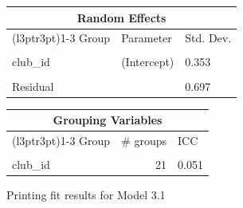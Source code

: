 \documentclass[
  12pt]{article}
\begin{document}
\begin{table}[!h]
\begin{tabular}{lll}
\toprule
\multicolumn{3}{c}{Random Effects} \\
\cmidrule(l{3pt}r{3pt}){1-3}
Group & Parameter & Std. Dev.\\
\midrule
\cellcolor{gray!10}{player\_id} & \cellcolor{gray!10}{(Intercept)} & \cellcolor{gray!10}{1.351}\\
club\_id & (Intercept) & 0.353\\
\cellcolor{gray!10}{club\_id} & \cellcolor{gray!10}{season\_year\_c} & \cellcolor{gray!10}{0.039}\\
Residual &  & 0.697\\
\bottomrule
\end{tabular}
\end{table} \begin{table}[!h]
\centering
\begin{tabular}{lrl}
\toprule
\multicolumn{3}{c}{Grouping Variables} \\
\cmidrule(l{3pt}r{3pt}){1-3}
Group & \# groups & ICC\\
\midrule
\cellcolor{gray!10}{player\_id} & \cellcolor{gray!10}{2159} & \cellcolor{gray!10}{0.749}\\
club\_id & 21 & 0.051\\
\bottomrule
\end{tabular}
\end{table}

\newpage

Printing fit results for Model 3.1
\end{document}
